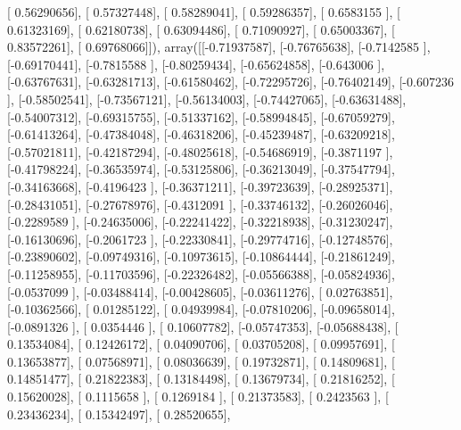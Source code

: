 \documentclass{article}
\begin{document}
       [ 0.56290656],
       [ 0.57327448],
       [ 0.58289041],
       [ 0.59286357],
       [ 0.6583155 ],
       [ 0.61323169],
       [ 0.62180738],
       [ 0.63094486],
       [ 0.71090927],
       [ 0.65003367],
       [ 0.83572261],
       [ 0.69768066]]), array([[-0.71937587],
       [-0.76765638],
       [-0.7142585 ],
       [-0.69170441],
       [-0.7815588 ],
       [-0.80259434],
       [-0.65624858],
       [-0.643006  ],
       [-0.63767631],
       [-0.63281713],
       [-0.61580462],
       [-0.72295726],
       [-0.76402149],
       [-0.607236  ],
       [-0.58502541],
       [-0.73567121],
       [-0.56134003],
       [-0.74427065],
       [-0.63631488],
       [-0.54007312],
       [-0.69315755],
       [-0.51337162],
       [-0.58994845],
       [-0.67059279],
       [-0.61413264],
       [-0.47384048],
       [-0.46318206],
       [-0.45239487],
       [-0.63209218],
       [-0.57021811],
       [-0.42187294],
       [-0.48025618],
       [-0.54686919],
       [-0.3871197 ],
       [-0.41798224],
       [-0.36535974],
       [-0.53125806],
       [-0.36213049],
       [-0.37547794],
       [-0.34163668],
       [-0.4196423 ],
       [-0.36371211],
       [-0.39723639],
       [-0.28925371],
       [-0.28431051],
       [-0.27678976],
       [-0.4312091 ],
       [-0.33746132],
       [-0.26026046],
       [-0.2289589 ],
       [-0.24635006],
       [-0.22241422],
       [-0.32218938],
       [-0.31230247],
       [-0.16130696],
       [-0.2061723 ],
       [-0.22330841],
       [-0.29774716],
       [-0.12748576],
       [-0.23890602],
       [-0.09749316],
       [-0.10973615],
       [-0.10864444],
       [-0.21861249],
       [-0.11258955],
       [-0.11703596],
       [-0.22326482],
       [-0.05566388],
       [-0.05824936],
       [-0.0537099 ],
       [-0.03488414],
       [-0.00428605],
       [-0.03611276],
       [ 0.02763851],
       [-0.10362566],
       [ 0.01285122],
       [ 0.04939984],
       [-0.07810206],
       [-0.09658014],
       [-0.0891326 ],
       [ 0.0354446 ],
       [ 0.10607782],
       [-0.05747353],
       [-0.05688438],
       [ 0.13534084],
       [ 0.12426172],
       [ 0.04090706],
       [ 0.03705208],
       [ 0.09957691],
       [ 0.13653877],
       [ 0.07568971],
       [ 0.08036639],
       [ 0.19732871],
       [ 0.14809681],
       [ 0.14851477],
       [ 0.21822383],
       [ 0.13184498],
       [ 0.13679734],
       [ 0.21816252],
       [ 0.15620028],
       [ 0.1115658 ],
       [ 0.1269184 ],
       [ 0.21373583],
       [ 0.2423563 ],
       [ 0.23436234],
       [ 0.15342497],
       [ 0.28520655],
\end{document}
